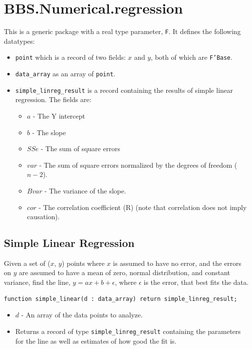\documentclass[10pt, openany]{book}
\newcommand{\indexfunc}[1]{\index[func]{#1}}
\newcommand{\datatype}[1]{\texttt{#1}}
\begin{document}
\section{BBS.Numerical.regression}
This is a generic package with a real type parameter, \datatype{F}.  It defines the following datatypes:
\begin{itemize}
  \item \datatype{point} which is a record of two fields: $x$ and $y$, both of which are \datatype{F'Base}.
  \item \datatype{data\_array} as an array of \datatype{point}.
  \item \datatype{simple\_linreg\_result} is a record containing the results of simple linear regression.  The fields are:
  \begin{itemize}
    \item $a$ - The Y intercept
    \item $b$ - The slope
    \item $SSe$ - The sum of square errors
    \item $var$ - The sum of square errors normalized by the degrees of freedom ($n-2$).
    \item $Bvar$ - The variance of the slope.
    \item $cor$ - The correlation coefficient (R) (note that correlation does not imply causation).
  \end{itemize}
\end{itemize}

\subsection{Simple Linear Regression}
Given a set of ($x$, $y$) points where $x$ is assumed to have no error, and the errors on $y$ are assumed to have a mean of zero, normal distribution, and constant variance, find the line, $y=ax+b+\epsilon$, where $\epsilon$ is the error, that best fits the data.
\begin{lstlisting}
function simple_linear(d : data_array) return simple_linreg_result;
\end{lstlisting}
\indexfunc{regress-simple\_linear}
\begin{itemize}
  \item $d$ - An array of the data points to analyze.
  \item Returns a record of type \datatype{simple\_linreg\_result} containing the parameters for the line as well as estimates of how good the fit is.
\end{itemize}
\end{document}
